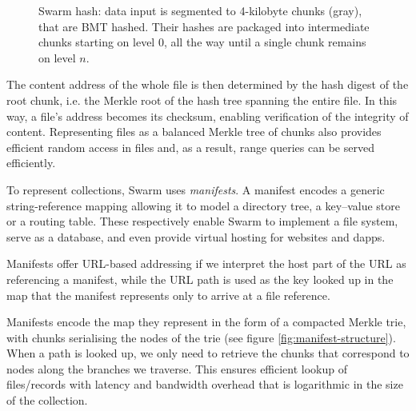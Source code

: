 \documentclass[12pt,a4paper]{article}
\begin{document}
\begin{figure}[!ht]
\centering
\resizebox{1\textwidth}{!}{
    
}
\caption[Swarm hash]{Swarm hash: data input is segmented to 4-kilobyte chunks (gray), that are BMT hashed. Their hashes are packaged into intermediate chunks starting on level $0$, all the way until a single chunk remains on level $n$. }
\label{fig:Swarm-hash}
\end{figure}

The content address of the whole file is then determined by the hash digest of the root chunk, i.e. the Merkle root of the hash tree spanning the entire file. In this way, a file’s address becomes its checksum, enabling verification of the integrity of content. Representing files as a balanced Merkle tree of chunks also provides efficient random access in files and, as a result, range queries can be served efficiently. 

To represent collections, Swarm uses \emph{manifests}. A manifest encodes a generic string-reference mapping allowing it to model a directory tree, a key--value store or a routing table. These respectively enable Swarm to implement a file system, serve as a database, and even provide virtual hosting for websites and dapps.



Manifests offer URL-based addressing if we interpret the host part of the URL as referencing a manifest, while the URL path is used as the key looked up in the map that the manifest represents only to arrive at a file reference. 

Manifests encode the map they represent in the form of a compacted Merkle trie, with chunks serialising the nodes of the trie (see figure \ref{fig:manifest-structure}). When a path is looked up, we only need to retrieve the chunks that correspond to nodes along the branches we traverse. This ensures efficient lookup of files/records with latency and bandwidth overhead that is logarithmic in the size of the collection. 
\end{document}
